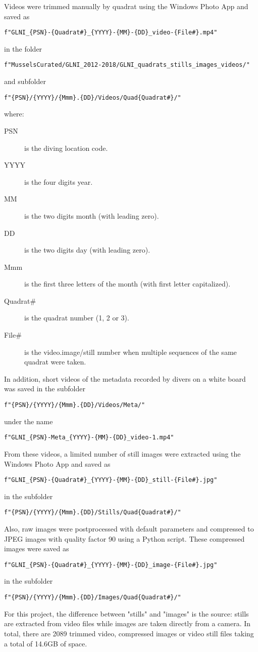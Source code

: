 \documentclass[11pt]{article} %
\begin{document}
Videos were trimmed manually by quadrat using the Windows Photo App and saved as 
\begin{verbatim}
f"GLNI_{PSN}-{Quadrat#}_{YYYY}-{MM}-{DD}_video-{File#}.mp4"
\end{verbatim}
 in the folder 
\begin{verbatim}
f"MusselsCurated/GLNI_2012-2018/GLNI_quadrats_stills_images_videos/"
\end{verbatim}
and subfolder
\begin{verbatim}
f"{PSN}/{YYYY}/{Mmm}.{DD}/Videos/Quad{Quadrat#}/"
\end{verbatim}
where:
\begin{description}
\item[PSN] is the diving location code.
\item[YYYY] is the four digits year.
\item[MM] is the two digits month (with leading zero).
\item[DD] is the two digits day (with leading zero).
\item[Mmm] is the first three letters of the month (with first letter capitalized).
\item[Quadrat\#] is the quadrat number (1, 2 or 3).
\item[File\#] is the video.image/still number when multiple sequences of the same quadrat were taken.
\end{description}
In addition, short videos of the metadata recorded by divers on a white board was saved in the subfolder
\begin{verbatim}
f"{PSN}/{YYYY}/{Mmm}.{DD}/Videos/Meta/"
\end{verbatim}
under the name
\begin{verbatim}
f"GLNI_{PSN}-Meta_{YYYY}-{MM}-{DD}_video-1.mp4"
\end{verbatim}
From these videos, a limited number of still images were extracted using the Windows Photo App and saved as
\begin{verbatim}
f"GLNI_{PSN}-{Quadrat#}_{YYYY}-{MM}-{DD}_still-{File#}.jpg"
\end{verbatim}
in the subfolder
\begin{verbatim}
f"{PSN}/{YYYY}/{Mmm}.{DD}/Stills/Quad{Quadrat#}/"
\end{verbatim}
Also, raw images were postprocessed with default parameters and compressed to JPEG images with quality factor 90 using a Python script. These compressed images were saved as
\begin{verbatim}
f"GLNI_{PSN}-{Quadrat#}_{YYYY}-{MM}-{DD}_image-{File#}.jpg"
\end{verbatim}
in the subfolder
\begin{verbatim}
f"{PSN}/{YYYY}/{Mmm}.{DD}/Images/Quad{Quadrat#}/"
\end{verbatim}
For this project, the difference between "stills" and "images" is the source: stills are extracted from video files while images are taken directly from a camera. In total, there are 2089 trimmed video, compressed images or video still files taking a total of 14.6GB of space.
\end{document}
